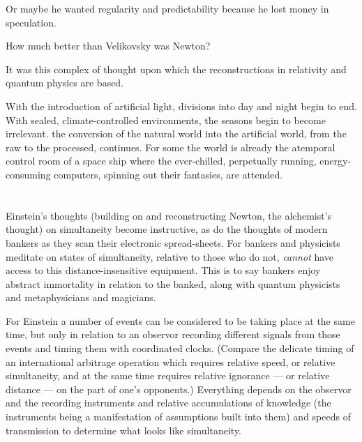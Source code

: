 \documentclass[11pt,twoside,draft]{memoir}
\begin{document}
Or maybe he wanted regularity and predictability because he lost money in speculation.

How much better than Velikovsky was Newton?

It was this complex of thought upon
which the reconstructions in relativity and
quantum physics are based.

With the introduction of artificial light, divisions into day and night begin to end. With
sealed, climate-controlled
environments,
the seasons begin to become irrelevant. the
conversion of the natural world into the artificial world, from the raw
to the processed, continues. For some the world is
already the atemporal control room of a
space ship where the ever-chilled, perpetually running, energy-consuming computers,
spinning out their fantasies, are attended.

\chapter{}

Einstein's thoughts (building on and reconstructing Newton, the alchemist's thought)
on simultaneity become instructive, as do
the thoughts of modern bankers as they scan
their electronic spread-sheets. For bankers
and physicists meditate on states of simultaneity, relative to those who do not, \emph{cannot}
have access to this distance-insensitive equipment. This is to say bankers enjoy abstract
immortality in relation to the banked, along
with quantum physicists and metaphysicians
and magicians.

For Einstein a number of events can be
considered to be taking place at the same
time, but only in relation to an observor
recording different signals from those events
and timing them with coordinated clocks.
(Compare the delicate timing of an international
arbitrage operation which requires relative speed, or relative simultaneity, and
at the same time requires relative ignorance ---
or relative distance --- on the part of one's opponents.) Everything depends on the observor and the recording instruments and
relative accumulations of knowledge (the instruments being a manifestation of assumptions built into them) and speeds of transmission to determine what looks like simultaneity.
\end{document}
